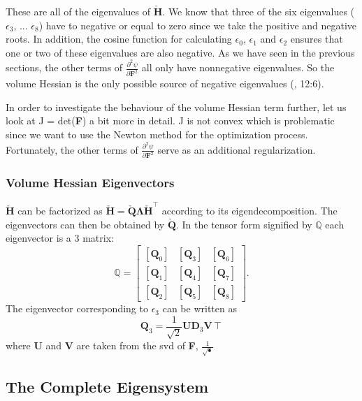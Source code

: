 These are all of the eigenvalues of $\mathbf{\check{H}}$. We know that three of the six eigenvalues ($\epsilon_3$, ... $\epsilon_8$) have to negative or equal to zero since we take the positive and negative roots. In addition, the cosine function for calculating $\epsilon_0$, $\epsilon_1$ and $\epsilon_2$ ensures that one or two of these eigenvalues are also negative. As we have seen in the previous sections, the other terms of $\frac{\partial^2 \psi}{\partial \mathbf{F}^2}$ all only have nonnegative eigenvalues. So the volume Hessian is the only possible source of negative eigenvalues (\cite{Smith:2018:SNF:3191713.3180491}, 12:6).

In order to investigate the behaviour of the volume Hessian term further, let us look at J = det(\textbf{F}) a bit more in detail. J is not convex which is problematic since we want to use the Newton method for the optimization process. Fortunately, the other terms of $\frac{\partial^2 \psi}{\partial \mathbf{F}^2}$ serve as an additional regularization.


\subsubsection{Volume Hessian Eigenvectors}
$\mathbf{\check{H}}$ can be factorized as $\mathbf{\check{H}} = \mathbf{\check{Q}}\mathbf{\Lambda}\mathbf{\check{H}}^\intercal$ according to its eigendecomposition. The eigenvectors can then be obtained by $\mathbf{\check{Q}}$. In the tensor form signified by $\mathbb{Q}$ each eigenvector is a 3  matrix:
\[
\mathbb{Q} = \left[\begin{array}{ccc}{\left[\mathbf{Q}_0\right]} & {\left[\mathbf{Q}_3\right]} & {\left[\mathbf{Q}_6\right]} \\ {\left[\mathbf{Q}_1\right]} & {\left[\mathbf{Q}_4\right]} & {\left[\mathbf{Q}_7\right]} \\ {\left[\mathbf{Q}_2\right]} & {\left[\mathbf{Q}_5\right]} & {\left[\mathbf{Q}_8\right]} \end{array}\right].
\]
The eigenvector corresponding to $\epsilon_3$ can be written as
\[
\mathbf{Q}_3 = \frac{1}{\sqrt{2}} \mathbf{U} \mathbf{D}_3 \mathbf{V}\intercal
\]
where \textbf{U} and \textbf{V} are taken from the \acrshort{svd} of \textbf{F}, $\frac{1}{\sqrt{•}}$


\subsection{The Complete Eigensystem}

